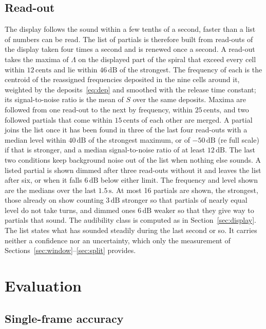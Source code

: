 \documentclass[10pt,a4paper,twocolumn]{article}
\newcommand{\dB}{\,\mathrm{dB}}
\newcommand{\s}{\,\mathrm{s}}
\newcommand{\ct}{\,\mathrm{cents}}
\begin{document}
\subsection{Read-out}

The display follows the sound within a few tenths of a second, faster than a list of numbers can be read. The list of partials is therefore built from read-outs of the display taken four times a second and is renewed once a second. A read-out takes the maxima of $\Lambda$ on the displayed part of the spiral that exceed every cell within $12\ct$ and lie within $46\dB$ of the strongest. The frequency of each is the centroid of the reassigned frequencies deposited in the nine cells around it, weighted by the deposits~\eqref{eq:dep} and smoothed with the release time constant; its signal-to-noise ratio is the mean of $S$ over the same deposits. Maxima are followed from one read-out to the next by frequency, within $25\ct$, and two followed partials that come within $15\ct$ of each other are merged. A partial joins the list once it has been found in three of the last four read-outs with a median level within $40\dB$ of the strongest maximum, or of $-50\dB$ (re full scale) if that is stronger, and a median signal-to-noise ratio of at least $12\dB$. The last two conditions keep background noise out of the list when nothing else sounds. A listed partial is shown dimmed after three read-outs without it and leaves the list after six, or when it falls $6\dB$ below either limit. The frequency and level shown are the medians over the last $1.5\s$. At most 16 partials are shown, the strongest, those already on show counting $3\dB$ stronger so that partials of nearly equal level do not take turns, and dimmed ones $6\dB$ weaker so that they give way to partials that sound. The audibility class is computed as in Section~\ref{sec:display}. The list states what has sounded steadily during the last second or so. It carries neither a confidence nor an uncertainty, which only the measurement of Sections~\ref{sec:window}--\ref{sec:split} provides.

\section{Evaluation}
\label{sec:eval}

\subsection{Single-frame accuracy}
\label{sec:accuracy}
\end{document}
